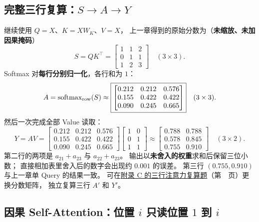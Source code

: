 \subsection{\texorpdfstring{完整三行复算：$S\to A\to Y$}{完整三行复算：S 到 A 到 Y}}
继续使用 $Q=X$、$K=XW_K$、$V=X$，
上一章得到的原始分数为（\textbf{未缩放、未加因果掩码}）
\[
S=QK^\top=\begin{bmatrix}
1&1&2\\
0&1&1\\
1&2&3
\end{bmatrix}\quad(3\times3).
\]
Softmax 对\textbf{每行分别归一化}，各行和为 $1$：
\begin{equation}
\label{eq:three-query-attention-weights}
A=\operatorname{softmax}_{\rm row}(S)
\approx\boxed{\begin{bmatrix}
0.212&0.212&0.576\\
0.155&0.422&0.422\\
0.090&0.245&0.665
\end{bmatrix}}\quad(3\times3).
\end{equation}
然后一次完成全部 Value 读取：
\begin{equation}
\label{eq:three-query-attention-output}
Y=AV=
\begin{bmatrix}
0.212&0.212&0.576\\
0.155&0.422&0.422\\
0.090&0.245&0.665
\end{bmatrix}
\begin{bmatrix}1&0\\0&1\\1&1\end{bmatrix}
\approx\boxed{\begin{bmatrix}
0.788&0.788\\
0.578&0.845\\
0.755&0.910
\end{bmatrix}}\quad(3\times2).
\end{equation}
第二行的两项是 $a_{21}+a_{23}$ 与 $a_{22}+a_{23}$。
输出以\textbf{未舍入的权重}求和后保留三位小数；
直接相加表里舍入后的数字会出现约 $0.001$ 的误差。
第三行 $(0.755,0.910)$ 与上一章单 Query 的结果一致。
可在\hyperref[exercise:batch-softmax-recompute]{附录 C 的三行注意力复算题}（第~\pageref*{exercise:batch-softmax-recompute}~页）更换分数矩阵，
独立复算三行 $A'$ 和 $Y'$。

\subsection{\texorpdfstring{因果 Self-Attention：位置 $i$ 只读位置 $1$ 到 $i$}{因果 Self-Attention：位置 i 只读位置 1 到 i}}
\label{concept:causal-mask}

